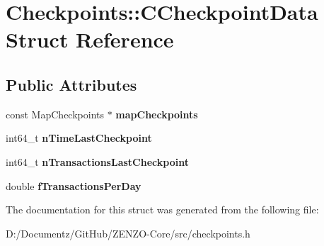\hypertarget{struct_checkpoints_1_1_c_checkpoint_data}{}\section{Checkpoints\+::C\+Checkpoint\+Data Struct Reference}
\label{struct_checkpoints_1_1_c_checkpoint_data}
\subsection*{Public Attributes}
\begin{DoxyCompactItemize}
\item 
\mbox{\label{struct_checkpoints_1_1_c_checkpoint_data_ab4aa42cde482f7cf7ab015abbf7108cb}} 
const Map\+Checkpoints $\ast$ {\bfseries map\+Checkpoints}
\item 
\mbox{\label{struct_checkpoints_1_1_c_checkpoint_data_a49124425a3f9ccddba8bce3dd67ad3b3}} 
int64\+\_\+t {\bfseries n\+Time\+Last\+Checkpoint}
\item 
\mbox{\label{struct_checkpoints_1_1_c_checkpoint_data_ad659d70f627b0c4529fc0e71f568de70}} 
int64\+\_\+t {\bfseries n\+Transactions\+Last\+Checkpoint}
\item 
\mbox{\label{struct_checkpoints_1_1_c_checkpoint_data_a9119b43d2bc8e47df84f14c230a1762d}} 
double {\bfseries f\+Transactions\+Per\+Day}
\end{DoxyCompactItemize}


The documentation for this struct was generated from the following file\+:\begin{DoxyCompactItemize}
\item 
D\+:/\+Documentz/\+Git\+Hub/\+Z\+E\+N\+Z\+O-\/\+Core/src/checkpoints.\+h\end{DoxyCompactItemize}
